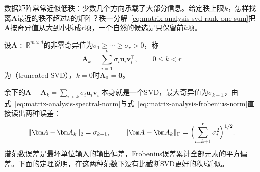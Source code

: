 数据矩阵常常近似低秩：少数几个方向承载了大部分信息。给定秩上限$k$，怎样找离$\bm A$最近的秩不超过$k$的矩阵？秩一分解~\eqref{eq:matrix-analysis-svd-rank-one-sum}把$\bm A$按奇异值从大到小拆成$r$项，一个自然的候选是只保留前$k$项。

设$\bm A\in\mathbb R^{m\times d}$的非零奇异值为$\sigma_1\geq\cdots\geq\sigma_r>0$，称
\begin{equation}
 \bm A_k=\sum_{i=1}^k\sigma_i\bm u_i\bm v_i^\top,
 \qquad 0\leq k<r
 \label{eq:matrix-analysis-truncated-svd}
\end{equation}
为（truncated SVD），$k=0$时$\bm A_0=\bm0$。

余下的$\bm A-\bm A_k=\sum_{i>k}\sigma_i\bm u_i\bm v_i^\top$本身就是一个SVD，最大奇异值为$\sigma_{k+1}$，由式~\eqref{eq:matrix-analysis-spectral-norm}与式~\eqref{eq:matrix-analysis-frobenius-norm}直接读出两种误差：
\begin{equation}
 \lVert\bm A-\bm A_k\rVert_2=\sigma_{k+1},\qquad
 \lVert\bm A-\bm A_k\rVert_{\mathrm F}
 =\Bigl(\sum_{i=k+1}^r\sigma_i^2\Bigr)^{1/2}.
 \label{eq:ls-truncated-errors}
\end{equation}
谱范数误差是最坏单位输入的输出偏差，Frobenius误差累计全部元素的平方偏差。下面的定理说明，在这两种范数下没有比截断SVD更好的秩$k$近似。

